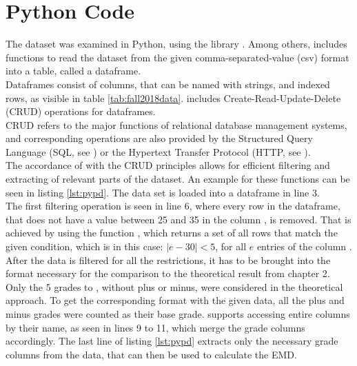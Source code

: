 \documentclass[12pt,letterpaper,oneside,openany]{book}
\begin{document}
\chapter{Python Code}
The dataset was examined in Python, using the library . Among others,  includes functions to read the dataset from the given comma-separated-value (csv) format into a table, called a dataframe. \\
Dataframes  consist of  columns, that can be named with strings,  and indexed rows, as visible in table \ref{tab:fall2018data}.  includes Create-Read-Update-Delete (CRUD) operations for dataframes. \\
CRUD refers to the major functions of relational database management systems, and corresponding operations are also provided by the Structured Query Language (SQL, see \cite{date1993iso}) or the Hypertext Transfer Protocol (HTTP, see \cite{fielding1999hypertext}).\\
The accordance of  with the CRUD principles allows for efficient filtering and extracting of  relevant parts of the dataset. 
An example for these functions can be seen in listing \ref{lst:pypd}. The data set is loaded into a dataframe in line 3. \\
The first filtering operation is seen in line 6, where every row in the dataframe, that does not have a value between 25 and 35 in the column , is removed. That is achieved by using the function , which returns a set of all rows that match the given condition, which is in this case: $|e - 30| < 5$, for all $e$ entries of the column .
After the data is filtered for all the restrictions, it has to be brought into the format necessary for the comparison to the theoretical result from chapter 2. Only the 5 grades  to , without plus or minus, were considered in the theoretical approach. To get the corresponding format with the given data, all the plus and minus grades were counted as their base grade.  supports accessing entire columns by their name, as seen in lines 9 to 11, which merge the grade columns accordingly. 
The last line of listing \ref{lst:pypd} extracts only the necessary grade columns from the data, that can then be used to calculate the EMD.
\end{document}
